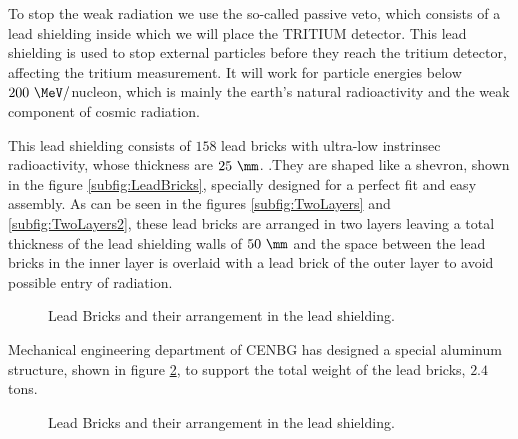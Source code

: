 To stop the weak radiation we use the so-called passive veto, which consists of a lead shielding inside which we will place the TRITIUM detector. This lead shielding is used to stop external particles before they reach the tritium detector, affecting the tritium measurement. It will work for particle energies below $200~\MeV/$nucleon, which is mainly the earth's natural radioactivity and the weak component of cosmic radiation.

This lead shielding consists of $158$ lead bricks with ultra-low instrinsec radioactivity, whose thickness are $25~\mm$. .They are shaped like a shevron, shown in the figure \ref{subfig:LeadBricks}, specially designed for a perfect fit and easy assembly. As can be seen in the figures \ref{subfig:TwoLayers} and \ref{subfig:TwoLayers2}, these lead bricks are arranged in two layers leaving a total thickness of the lead shielding walls of $50~\mm$ and the space between the lead bricks in the inner layer is overlaid with a lead brick of the outer layer to avoid possible entry of radiation.

\begin{figure}[htbp]
 \centering
 \caption{Lead Bricks and their arrangement in the lead shielding.}
 \label{fig:LeadBricksAndArrangement}
\end{figure}

Mechanical engineering department of CENBG has designed a special aluminum structure, shown in figure \ref{fig:AluminiumStructure}, to support the total weight of the lead bricks, $2.4$ tons.

\begin{figure}[htbp]
 \centering
    \caption{Lead Bricks and their arrangement in the lead shielding.}
 \label{fig:AluminiumStructure}
\end{figure}

